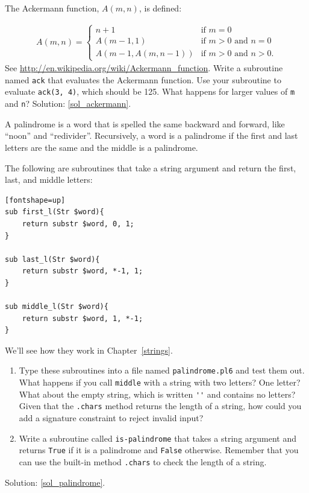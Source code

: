 \begin{exercise}
\label{ackermann}

The Ackermann function, $A(m, n)$, is defined:

\begin{eqnarray*}
A(m, n) = \begin{cases} 
              n+1 & \mbox{if } m = 0 \\ 
        A(m-1, 1) & \mbox{if } m > 0 \mbox{ and } n = 0 \\ 
A(m-1, A(m, n-1)) & \mbox{if } m > 0 \mbox{ and } n > 0.
\end{cases} 
\end{eqnarray*}
%
See \url{http://en.wikipedia.org/wiki/Ackermann_function}.
Write a subroutine named {\tt ack} that evaluates the Ackermann function.
Use your subroutine to evaluate {\tt ack(3, 4)}, which should be 125.
What happens for larger values of {\tt m} and {\tt n}?
Solution: \ref{sol_ackermann}.

\end{exercise}


\begin{exercise}
\label{palindrome}

A palindrome is a word that is spelled the same backward and
forward, like ``noon'' and ``redivider''.  Recursively, a word
is a palindrome if the first and last letters are the same
and the middle is a palindrome.

The following are subroutines that take a string argument and
return the first, last, and middle letters:

\begin{verbatim}[fontshape=up]
sub first_l(Str $word){
    return substr $word, 0, 1;
}

sub last_l(Str $word){
    return substr $word, *-1, 1;
}

sub middle_l(Str $word){
    return substr $word, 1, *-1;
}
\end{verbatim}
%
We'll see how they work in Chapter~\ref{strings}.

\begin{enumerate}

\item Type these subroutines into a file named {\tt palindrome.pl6}
and test them out.  What happens if you call {\tt middle} with
a string with two letters?  One letter?  What about the empty
string, which is written \verb"''" and contains no letters? Given that the {\tt .chars} method returns the length of a 
string, how could you add a signature constraint to reject invalid input?

\item Write a subroutine called \verb"is-palindrome" that takes
a string argument and returns {\tt True} if it is a palindrome
and {\tt False} otherwise.  Remember that you can use the
built-in method {\tt .chars} to check the length of a string.

\end{enumerate}

Solution: \ref{sol_palindrome}.

\end{exercise}

